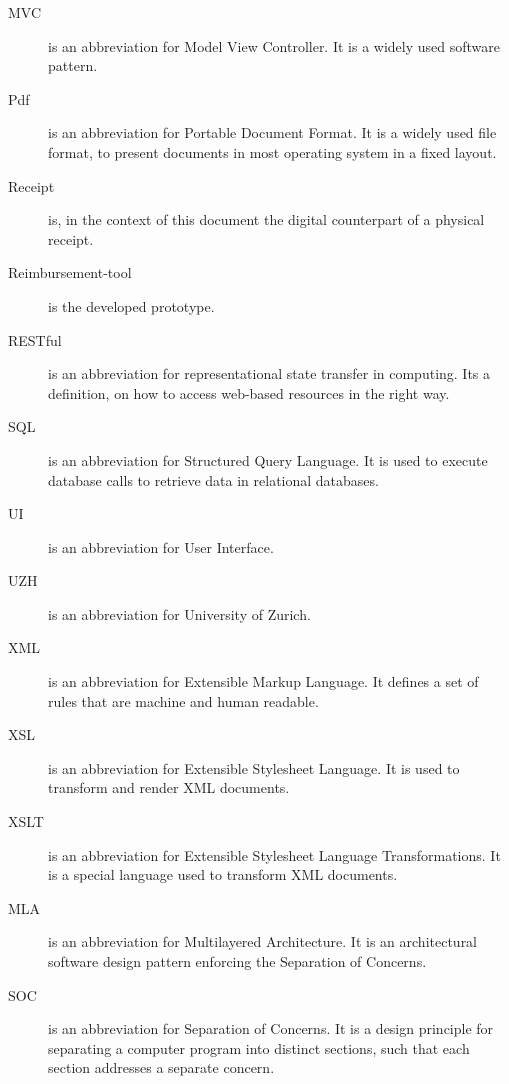 \begin{description}
    \item[MVC] is an abbreviation for Model View Controller. It is a widely used software pattern.
    \item[Pdf] is an abbreviation for Portable Document Format. It is a widely used file format, to present documents in most operating system in a fixed layout.
    \item[Receipt] is, in the context of this document the digital counterpart of a physical receipt.
    \item[Reimbursement-tool] is the developed prototype.
    \item[RESTful] is an abbreviation for representational state transfer in computing. Its a definition, on how to access web-based resources in the right way.
    \item[SQL] is an abbreviation for Structured Query Language. It is used to execute database calls to retrieve data in relational databases.
    \item[UI] is an abbreviation for User Interface. 
    \item[UZH] is an abbreviation for University of Zurich.
    \item[XML] is an abbreviation for Extensible Markup Language. It defines a set of rules that are machine and human readable.
    \item[XSL] is an abbreviation for Extensible Stylesheet Language. It is used to transform and render XML documents.
    \item[XSLT] is an abbreviation for Extensible Stylesheet Language Transformations. It is a special language used to transform XML documents.
    \item[MLA] is an abbreviation for Multilayered Architecture. It is an architectural software design pattern enforcing the Separation of Concerns.
    \item[SOC] is an abbreviation for Separation of Concerns. It is a design principle for separating a computer program into distinct sections, such that each section addresses a separate concern\cite{soc}.
\end{description}
